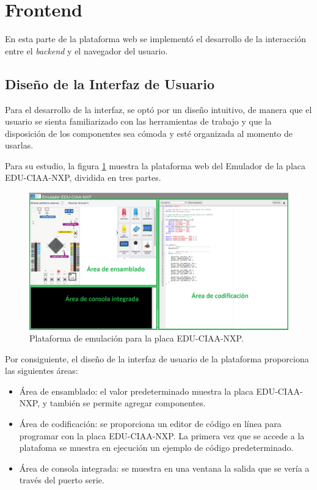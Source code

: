 \section{Frontend}
En esta parte de la plataforma web se implementó el desarrollo de la interacción entre el \textit{backend} y el navegador del usuario.


\subsection{Diseño de la Interfaz de Usuario}

Para el desarrollo de la interfaz, se optó por un diseño intuitivo, de manera que el usuario se sienta familiarizado con las herramientas de trabajo y que la disposición de los componentes sea cómoda y esté organizada al momento de usarlas.

Para su estudio, la figura \ref{fig:PlataformaEmulador1} muestra la plataforma web del Emulador de la placa EDU-CIAA-NXP, dividida en tres partes.

\begin{figure}[ht]
	\centering
	\includegraphics[scale=.28]{./Figures/PlataformaEmulador.png}
	\caption{Plataforma de emulación para la placa EDU-CIAA-NXP.}
	\label{fig:PlataformaEmulador1}
\end{figure}


Por consiguiente, el diseño de la interfaz de usuario de la plataforma proporciona las siguientes áreas:

\begin{itemize}
	\item Área de ensamblado: el valor predeterminado muestra la placa EDU-CIAA-NXP, y también se permite agregar componentes.
	\item Área de codificación: se proporciona un editor de código en línea para programar con la placa EDU-CIAA-NXP. La primera vez que se accede a la platafoma se muestra en ejecución un ejemplo de código predeterminado.
	\item Área de consola integrada: se muestra en una ventana la salida que se vería a través del puerto serie. 
\end{itemize}


